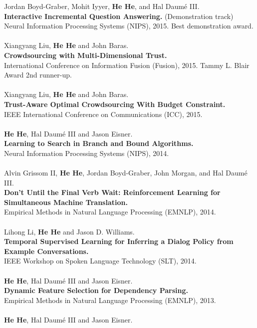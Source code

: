 \documentclass[a4paper,11pt]{article}
\begin{document}
Jordan Boyd-Graber, Mohit Iyyer, {\bf He He}, and Hal Daum\'e III.\\
{\bf Interactive Incremental Question Answering.} (Demonstration track)\\
Neural Information Processing Systems (NIPS), 2015. 
Best demonstration award.\\
\\
Xiangyang Liu, {\bf He He} and John Baras.\\
{\bf Crowdsourcing with Multi-Dimensional Trust.}\\
International Conference on Information Fusion (Fusion), 2015.
Tammy L. Blair Award 2nd runner-up.\\
\\
Xiangyang Liu, {\bf He He} and John Baras.\\
{\bf Trust-Aware Optimal Crowdsourcing With Budget Constraint.}\\
IEEE International Conference on Communications (ICC), 2015.\\
\\
{\bf He He}, Hal Daum\'e III and Jason Eisner. \\
{\bf Learning to Search in Branch and Bound Algorithms.}\\
Neural Information Processing Systems (NIPS), 2014.\\
\\
Alvin Grissom II, {\bf He He}, Jordan Boyd-Graber, John Morgan, and Hal Daum\'e III. \\
{\bf Don't Until the Final Verb Wait: Reinforcement Learning for Simultaneous Machine Translation.}\\
Empirical Methods in Natural Language Processing (EMNLP), 2014.\\
\\
Lihong Li, {\bf He He} and Jason D. Williams. \\
{\bf Temporal Supervised Learning for Inferring a Dialog Policy from Example Conversations.}\\
IEEE Workshop on Spoken Language Technology (SLT), 2014.\\
\\
{\bf He He}, Hal Daum\'e III and Jason Eisner.\\
{\bf Dynamic Feature Selection for Dependency Parsing.}\\ 
Empirical Methods in Natural Language Processing (EMNLP), 2013.\\
\\
{\bf He He}, Hal Daum\'e III and Jason Eisner.\\
\end{document}
